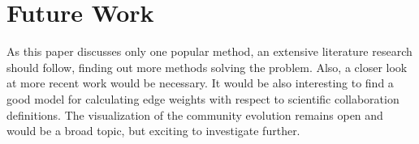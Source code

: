 \documentclass[runningheads,a4paper]{llncs}
\begin{document}
\section{Future Work}
As this paper discusses only one popular method, an extensive literature research should follow, finding out more methods solving the problem. Also, a closer look at more recent work would be necessary. It would be also interesting to find a good model for calculating edge weights with respect to scientific collaboration definitions. The visualization of the community evolution remains open and would be a broad topic, but exciting to investigate further.

{
	
	
}
\end{document}
